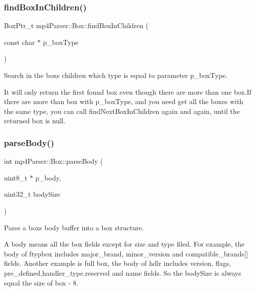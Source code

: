 \subsubsection{\texorpdfstring{findBoxInChildren()}{findBoxInChildren()}}
{\footnotesize\ttfamily Box\+Ptr\+\_\+t mp4\+Parser\+::\+Box\+::find\+Box\+In\+Children (\begin{DoxyParamCaption}\item[{const char $\ast$}]{p\+\_\+box\+Type }\end{DoxyParamCaption})}



Search in the box\textquotesingle{}s children which type is equal to parameter p\+\_\+box\+Type. 

It will only return the first found box even though there are more than one box.\+If there are more than box with p\+\_\+box\+Type, and you need get all the boxes with the same type, you can call find\+Next\+Box\+In\+Children again and again, until the returned box is null. \mbox{\label{classmp4_parser_1_1_box_a3dd0c084ac65bc77b69ac5ecaf796cb2}} 
\subsubsection{\texorpdfstring{parseBody()}{parseBody()}}
{\footnotesize\ttfamily int mp4\+Parser\+::\+Box\+::parse\+Body (\begin{DoxyParamCaption}\item[{uint8\+\_\+t $\ast$}]{p\+\_\+body,  }\item[{uint32\+\_\+t}]{body\+Size }\end{DoxyParamCaption})\hspace{0.3cm}{\ttfamily [virtual]}}



Parse a box\textquotesingle{}s body buffer into a box structure. 

A body means all the box fields except for size and type filed. For example, the body of ftypbox includes major\+\_\+brand, minor\+\_\+version and compatible\+\_\+brands\mbox{[}\mbox{]} fields. Another example is full box, the body of hdlr includes version, flags, pre\+\_\+defined,handler\+\_\+type,reserved and name fields. So the body\+Size is always equal the size of box -\/ 8. 

